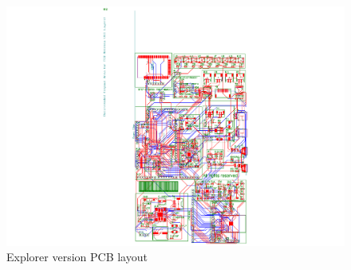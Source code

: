 \documentclass[sigconf]{acmart}
\begin{document}
\begin{figure}[h]
  \centering
  \includegraphics[width=\linewidth]{Misaka-v1-2.pdf}
  \caption{Explorer version PCB layout}
  \label{fig:Explorer-layout}
\end{figure}
\end{document}
